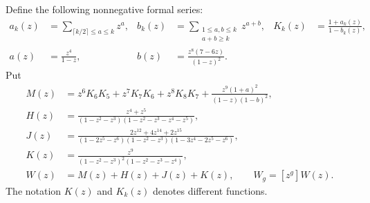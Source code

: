 \documentclass[11pt]{amsart}
\theoremstyle{definition}
\theoremstyle{remark}
\numberwithin{equation}{section}
\begin{document}
Define the following nonnegative formal series:
\begin{align*}
 a_k(z)&=\sum_{\lceil k/2\rceil\le a\le k}z^a,&
 b_k(z)&=\sum_{\substack{1\le a,b\le k\\a+b\ge k}}z^{a+b},&
 K_k(z)&=\frac{1+a_k(z)}{1-b_k(z)},\\
 a(z)&=\frac{z^4}{1-z},&
 b(z)&=\frac{z^8(7-6z)}{(1-z)^2}.
\end{align*}
Put
\begin{align}
 M(z)&=z^6K_6K_5+z^7K_7K_6+z^8K_8K_7
       +\frac{z^9(1+a)^2}{(1-z)(1-b)^2},\label{cmb:M}\\
 H(z)&=\frac{z^4+z^5}{(1-z^2-z^3)(1-z^2-z^3-z^4-z^5)},\nonumber\\
 J(z)&=\frac{2z^{12}+4z^{14}+2z^{15}}
 {(1-2z^5-z^6)(1-z^2-z^3)(1-3z^4-2z^5-z^6)},\nonumber\\
 K(z)&=\frac{z^9}{(1-z^2-z^3)^2(1-z^2-z^3-z^4)},\nonumber\\
 W(z)&=M(z)+H(z)+J(z)+K(z),\qquad W_g=[z^g]W(z).\label{cmb:W}
\end{align}
The notation $K(z)$ and $K_k(z)$ denotes different functions.
\end{document}
